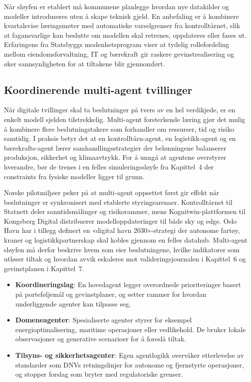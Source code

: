 Når sløyfen er etablert må kommunene planlegge hvordan nye datakilder og modeller introduseres uten å skape teknisk gjeld. En anbefaling er å kombinere kvartalsvise læringsmøter med automatiske varselgrenser fra kontrolltårnet, slik at fagansvarlige kan beslutte om modellen skal retrenes, oppdateres eller fases ut. Erfaringene fra Statsbyggs modenhetsprogram viser at tydelig rollefordeling mellom eiendomsforvaltning, IT og bærekraft gir raskere gevinstrealisering og øker sannsynligheten for at tiltakene blir gjennomført.\citep{statsbygg2023digitalmodenhet,digdir2022gevinst}

\subsection{Koordinerende multi-agent tvillinger}
Når digitale tvillinger skal ta beslutninger på tvers av en hel verdikjede, er en enkelt modell sjelden tilstrekkelig. Multi-agent forsterkende læring gjør det mulig å kombinere flere beslutningstakere som forhandler om ressurser, tid og risiko samtidig.\citep{zhang2021multiagent} I praksis betyr det at en kontrolltårn-agent, en logistikk-agent og en bærekrafts-agent lærer samhandlingsstrategier der belønningene balanserer produksjon, sikkerhet og klimaavtrykk. For å unngå at agentene overstyrer hverandre, bør de trenes i en felles simuleringssløyfe fra Kapittel~4 der constraints fra fysiske modeller ligger til grunn.

Norske pilotmiljøer peker på at multi-agent oppsettet først gir effekt når beslutninger er synkronisert med etablerte styringsarenaer. Kontrolltårnet til Statnett deler sanntidsmålinger og risikorammer, mens Kognitwin-plattformen til Kongsberg Digital distribuerer modelloppdateringer til både sky og edge.\citep{statnett2024kontrolltarn,kongsberg2023kognitwin} Oslo Havn har i tillegg definert en «digital havn 2030»-strategi der autonome fartøy, kraner og logistikkpartnerskap skal kobles gjennom en felles datahub.\citep{oslohavn2023digitalhavn} Multi-agent sløyfen må derfor beskrive hvem som eier beslutningene, hvilke indikatorer som utløser tiltak og hvordan avvik eskaleres mot valideringsjournalen i Kapittel~6 og gevinstplanen i Kapittel~7.

\begin{itemize}
    \item \textbf{Koordineringslag}: En hovedagent legger overordnede prioriteringer basert på porteføljemål og gevinstplaner, og setter rammer for hvordan underliggende agenter kan tilpasse seg.
    \item \textbf{Domeneagenter}: Spesialiserte agenter styrer for eksempel energioptimalisering, maritime operasjoner eller vedlikehold. De bruker lokale observasjoner og generative scenarioer for å foreslå tiltak.
    \item \textbf{Tilsyns- og sikkerhetsagenter}: Egen agentlogikk overvåker etterlevelse av standarder som DNVs retningslinjer for autonome og fjernstyrte operasjoner, og stopper forslag som bryter med regulatoriske grenser.\citep{dnv2021autonomous}
\end{itemize}

